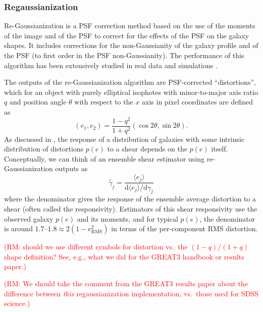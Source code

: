 \documentclass[iop]{emulateapj}
\newcommand\rmcomment[1]{\textcolor{red}{(RM: #1)}}
\begin{document}
\subsubsection{Regaussianization}

Re-Gaussianization \citep{2003MNRAS.343..459H} is a PSF correction
method based on the use of the moments of the image and of the PSF to
correct for the effects of the PSF on the galaxy shapes. It includes
corrections for the non-Gaussianity of the galaxy profile
\citep{2002AJ....123..583B,2003MNRAS.343..459H} and of the PSF (to
first order in the PSF non-Gaussianity). The performance of this
algorithm has been extensively studied in real data and simulations
\citep[e.g.,][]{2005MNRAS.361.1287M,2012MNRAS.420.1518M,2013MNRAS.432.1544M,2015MNRAS.450.2963M}.

The outputs of the re-Gaussianization algorithm are PSF-corrected
``distortions'', which for an object with purely elliptical isophotes
with minor-to-major axis ratio $q$ and position angle $\theta$ with
respect to the $x$ axis in pixel coordinates are defined as
\begin{equation}
(e_1, e_2) = \frac{1-q^2}{1+q^2}\left(\cos{2\theta},\sin{2\theta}\right).
\end{equation}
As discussed in \cite{2002AJ....123..583B}, the response of a
distribution of galaxies with some intrinsic distribution of
distortions $p(e)$ to a shear %
depends on
the $p(e)$ itself.  Conceptually, we can think of an ensemble shear
estimator using re-Gaussianization outputs as
\begin{equation}
\hat{\gamma}_j = \frac{\langle e_j\rangle}{\mathrm{d}\langle e_j\rangle/\mathrm{d}\gamma_j}
\end{equation}
where the denominator gives the response of the ensemble average
distortion to a shear (often called the responsivity).  Estimators of
this shear responsivity use the observed galaxy $p(e)$ and its
moments, and for typical $p(e)$, the denominator is around
$1.7$--$1.8\approx 2 (1-e_\text{RMS}^2)$ in terms of the per-component RMS distortion.

\rmcomment{should we use different symbols for distortion vs.\ the $(1-q)/(1+q)$ shape definition?
  See, e.g., what we did for the GREAT3 handbook or results paper.}

\rmcomment{We should take the comment from the GREAT3 results paper about the difference between
  {\em this} regaussianization implementation, vs.\ those used for SDSS science.}
\end{document}
